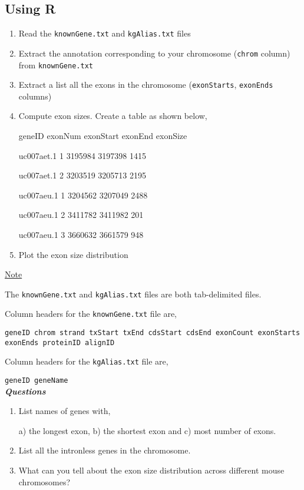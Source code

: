 \documentclass[a4paper,11pt]{article}
\begin{document}
\subsection{Using R}
\begin{enumerate}
\normalsize\item Read the \texttt{knownGene.txt} and \texttt{kgAlias.txt}  files
\item Extract the annotation corresponding to your chromosome (\texttt{chrom} column) from \texttt{knownGene.txt}
\item Extract a list all the exons in the chromosome (\texttt{exonStarts}, \texttt{exonEnds} columns)
\item Compute exon sizes. Create a table as shown below,

\scriptsize geneID exonNum exonStart exonEnd exonSize

\scriptsize uc007aet.1	1	3195984	3197398	1415

\scriptsize uc007aet.1	2	3203519	3205713	2195

\scriptsize uc007aeu.1	1	3204562	3207049	2488

\scriptsize uc007aeu.1	2	3411782	3411982	201

\scriptsize uc007aeu.1	3	3660632	3661579	948

\normalsize\item Plot the exon size distribution
\end{enumerate}

\normalsize\underline{Note}

\normalsize The \texttt{knownGene.txt} and \texttt{kgAlias.txt} files are both tab-delimited files.

Column headers for the \texttt{knownGene.txt} file are,

\scriptsize\texttt {geneID	chrom	strand	txStart	txEnd	cdsStart	cdsEnd	exonCount	exonStarts	exonEnds	proteinID	alignID}

\normalsize {Column headers for the \texttt{kgAlias.txt} file are,}

\scriptsize\texttt {geneID	geneName}\\

\Large {\emph\bf Questions}
\begin{enumerate}
\normalsize\item List names of genes with,

 a) the longest exon, b) the shortest exon and c) most number of exons.

\item List all the intronless genes in the chromosome.
\item What can you tell about the exon size distribution across different mouse chromosomes?
\end{enumerate}
\end{document}
